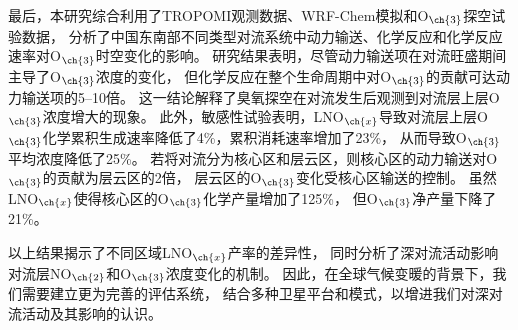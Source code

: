 {最后，本研究综合利用了TROPOMI观测数据、WRF-Chem模拟和O$_{\ch{3}}$探空试验数据，
分析了中国东南部不同类型对流系统中动力输送、化学反应和化学反应速率对O$_{\ch{3}}$时空变化的影响。
研究结果表明，尽管动力输送项在对流旺盛期间主导了O$_{\ch{3}}$浓度的变化，
但化学反应在整个生命周期中对O$_{\ch{3}}$的贡献可达动力输送项的5--10倍。
这一结论解释了臭氧探空在对流发生后观测到对流层上层O$_{\ch{3}}$浓度增大的现象。
此外，敏感性试验表明，LNO$_{\ch{x}}$导致对流层上层O$_{\ch{3}}$化学累积生成速率降低了4\%，累积消耗速率增加了23\%，
从而导致O$_{\ch{3}}$平均浓度降低了25\%。
若将对流分为核心区和层云区，则核心区的动力输送对O$_{\ch{3}}$的贡献为层云区的2倍，
层云区的O$_{\ch{3}}$变化受核心区输送的控制。
虽然LNO$_{\ch{x}}$使得核心区的O$_{\ch{3}}$化学产量增加了125\%，
但O$_{\ch{3}}$净产量下降了21\%。

以上结果揭示了不同区域LNO$_{\ch{x}}$产率的差异性，
同时分析了深对流活动影响对流层NO$_{\ch{2}}$和O$_{\ch{3}}$浓度变化的机制。
因此，在全球气候变暖的背景下，我们需要建立更为完善的评估系统，
结合多种卫星平台和模式，以增进我们对深对流活动及其影响的认识。
}
